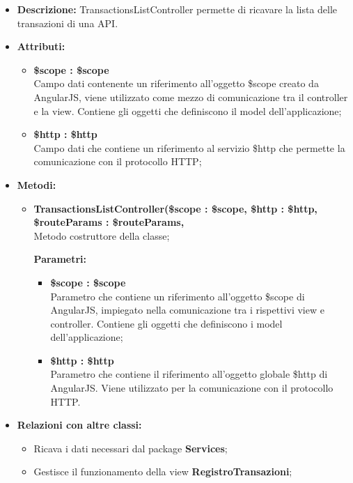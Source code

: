 \begin{itemize}
	\item \textbf{Descrizione:} TransactionsListController permette di ricavare la lista delle transazioni di una API.
	\item \textbf{Attributi:}
	\begin{itemize}
		
		\item \textbf{\$scope : \$scope}\\
		Campo dati contenente un riferimento all'oggetto \$scope creato da AngularJS, viene utilizzato come mezzo di comunicazione tra il controller e la view. Contiene gli oggetti che definiscono il model dell'applicazione;
		
		\item \textbf{\$http : \$http }\\
		Campo dati che contiene un riferimento al servizio \$http che permette la comunicazione con il protocollo HTTP;
		
	\end{itemize}
	\item \textbf{Metodi:}
	\begin{itemize}
		
		\item \textbf{TransactionsListController(\$scope : \$scope, \$http : \$http, \$routeParams : \$routeParams,}\\
		Metodo costruttore della classe;
		\begin{description}
			\item[\textbf{Parametri:}]
		\end{description}
		\begin{itemize}
			\item \textbf{\$scope : \$scope}\\
			Parametro che contiene un riferimento all'oggetto \$scope di AngularJS, impiegato nella comunicazione tra i rispettivi view e controller. Contiene gli oggetti che definiscono i model dell'applicazione;
			
			\item \textbf{\$http : \$http}\\
			Parametro che contiene il riferimento all'oggetto globale \$http di AngularJS. Viene utilizzato per la comunicazione con il protocollo HTTP.
			
		\end{itemize}
		
	\end{itemize}
	\item \textbf{Relazioni con altre classi:}
	\begin{itemize}
		\item Ricava i dati necessari dal package \textbf{Services};
		\item Gestisce il funzionamento della view \textbf{RegistroTransazioni};
	\end{itemize}
\end{itemize}

